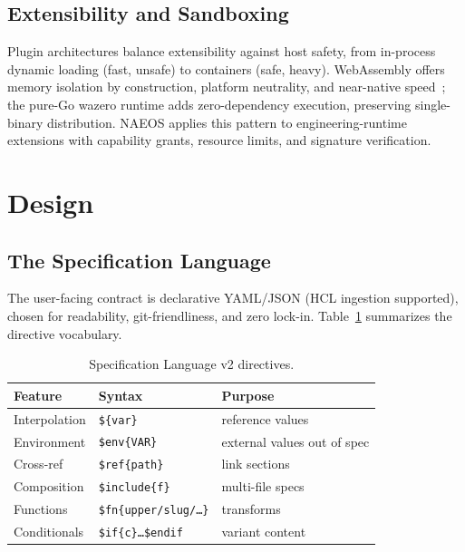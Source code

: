 \documentclass[sigconf,nonacm]{acmart}
\begin{document}
\subsection{Extensibility and Sandboxing}
Plugin architectures balance extensibility against host safety, from in-process dynamic loading (fast, unsafe) to containers (safe, heavy). WebAssembly offers memory isolation by construction, platform neutrality, and near-native speed~\cite{wasm2017}; the pure-Go wazero runtime adds zero-dependency execution, preserving single-binary distribution. NAEOS applies this pattern to engineering-runtime extensions with capability grants, resource limits, and signature verification.

\section{Design}
\label{sec:design}

\subsection{The Specification Language}
The user-facing contract is declarative YAML/JSON (HCL ingestion supported), chosen for readability, git-friendliness, and zero lock-in. Table~\ref{tab:lang} summarizes the directive vocabulary.

\begin{table}[t]
\centering
\caption{Specification Language v2 directives.}
\label{tab:lang}
\small
\begin{tabular}{@{}lll@{}}
\toprule
\textbf{Feature} & \textbf{Syntax} & \textbf{Purpose}\\
\midrule
Interpolation & \texttt{\$\{var\}} & reference values\\
Environment & \texttt{\$env\{VAR\}} & external values out of spec\\
Cross-ref & \texttt{\$ref\{path\}} & link sections\\
Composition & \texttt{\$include\{f\}} & multi-file specs\\
Functions & \texttt{\$fn\{upper/slug/\ldots\}} & transforms\\
Conditionals & \texttt{\$if\{c\}\ldots\$endif} & variant content\\
\bottomrule
\end{tabular}
\end{table}
\end{document}
